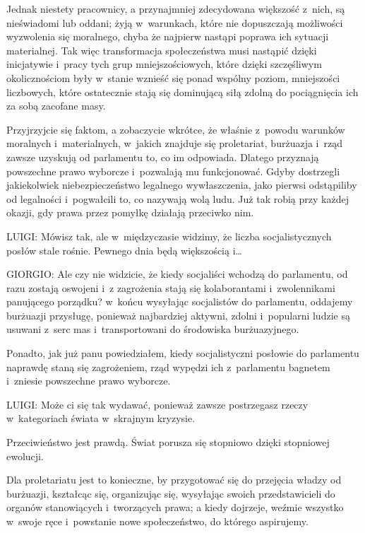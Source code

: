 \documentclass[oneside,polish,11pt,sfheadings]{mwbk}
\begin{document}
 
Jednak niestety pracownicy, a przynajmniej zdecydowana większość z~nich, są nieświadomi lub oddani; żyją w~warunkach,
które nie dopuszczają możliwości wyzwolenia się moralnego, chyba że najpierw nastąpi poprawa ich sytuacji materialnej.
Tak więc transformacja społeczeństwa musi nastąpić dzięki inicjatywie i~pracy tych grup mniejszościowych, które dzięki
szczęśliwym okolicznościom były w~stanie wznieść się ponad wspólny poziom, mniejszości liczbowych, które ostatecznie
stają się dominującą siłą zdolną do pociągnięcia ich za sobą zacofane masy. 

 
Przyjrzyjcie się faktom, a zobaczycie wkrótce, że właśnie z~powodu warunków moralnych i~materialnych, w~jakich znajduje
się proletariat, burżuazja i~rząd zawsze uzyskują od parlamentu to, co im odpowiada. Dlatego przyznają powszechne prawo
wyborcze i~pozwalają mu funkcjonować. Gdyby dostrzegli jakiekolwiek niebezpieczeństwo legalnego wywłaszczenia, jako
pierwsi odstąpiliby od legalności i~pogwałcili to, co nazywają wolą ludu. Już tak robią przy każdej okazji, gdy prawa
przez pomyłkę działają przeciwko nim. 




 
\noindent LUIGI: Mówisz tak, ale w~międzyczasie widzimy, że liczba socjalistycznych posłów stale rośnie. Pewnego dnia będą
większością i\ldots 




 
\noindent GIORGIO: Ale czy nie widzicie, że kiedy socjaliści wchodzą do parlamentu, od razu zostają oswojeni i~z zagrożenia stają
się kolaborantami i~zwolennikami panującego porządku? w~końcu wysyłając socjalistów do parlamentu, oddajemy burżuazji
przysługę, ponieważ najbardziej aktywni, zdolni i~popularni ludzie są usuwani z~serc mas i~transportowani do środowiska
burżuazyjnego. 

 
Ponadto, jak już panu powiedziałem, kiedy socjalistyczni posłowie do parlamentu naprawdę staną się zagrożeniem, rząd
wypędzi ich z~parlamentu bagnetem i~zniesie powszechne prawo wyborcze. 




 
\noindent LUIGI: Może ci się tak wydawać, ponieważ zawsze postrzegasz rzeczy w~kategoriach świata w~skrajnym kryzysie. 

 
Przeciwieństwo jest prawdą. Świat porusza się stopniowo dzięki stopniowej ewolucji. 

 
Dla proletariatu jest to konieczne, by przygotować się do przejęcia władzy od burżuazji, kształcąc się, organizując się,
wysyłając swoich przedstawicieli do organów stanowiących i~tworzących prawa; a kiedy dojrzeje, weźmie wszystko w~swoje
ręce i~powstanie nowe społeczeństwo, do którego aspirujemy. 
\end{document}
